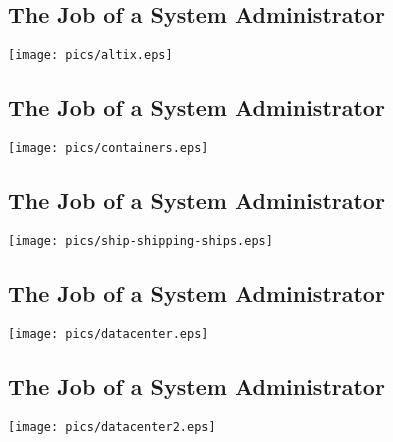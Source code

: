 \documentclass[xga]{xdvislides}
\begin{document}
\subsection{The Job of a System Administrator}
\vspace*{\fill}
\begin{center}
	\texttt{[image: pics/altix.eps]} \\
\end{center}
\vspace*{\fill}

\subsection{The Job of a System Administrator}
\vspace*{\fill}
\begin{center}
	\texttt{[image: pics/containers.eps]} \\
\end{center}
\vspace*{\fill}

\subsection{The Job of a System Administrator}
\vspace*{\fill}
\begin{center}
	\texttt{[image: pics/ship-shipping-ships.eps]} \\
\end{center}
\vspace*{\fill}


\subsection{The Job of a System Administrator}
\vspace*{\fill}
\begin{center}
	\texttt{[image: pics/datacenter.eps]} \\
\end{center}
\vspace*{\fill}

\subsection{The Job of a System Administrator}
\vspace*{\fill}
\begin{center}
	\texttt{[image: pics/datacenter2.eps]} \\
\end{center}
\vspace*{\fill}
\end{document}
